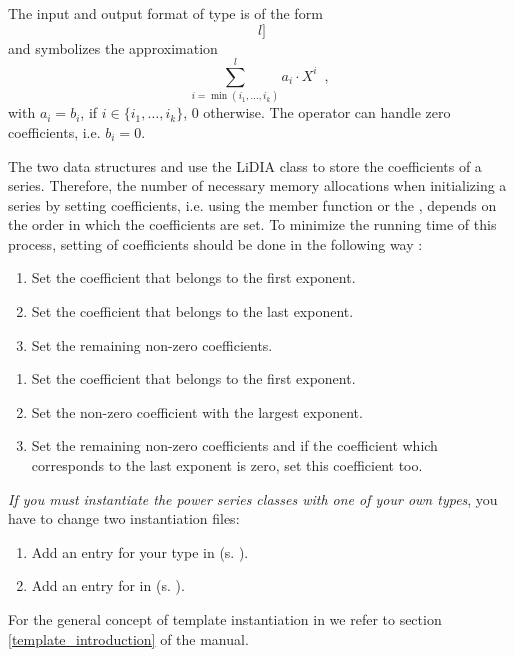 The input and output format of type  is of the form
\begin{displaymath}
  [ [ (b_{i_{1}},i_{1}), \dots, (b_{i_{k}},i_{k}) ] \; l ]
\end{displaymath}
and symbolizes the approximation
\begin{displaymath}
  \sum_{i=\min(i_{1},\dots,i_{k}) }^{l} a_{i} \cdot X^{i}\enspace,
\end{displaymath}
with $a_{i} = b_{i}$, if $i \in \{i_{1}, \dots, i_{k}\}$, $0$ otherwise.  The operator\code{>>}
can handle zero coefficients, i.e. $b_{i} = 0$.



\NOTES

The two data structures  and  use
the LiDIA class  to store the coefficients of a series.  Therefore, the
number of necessary memory allocations when initializing a series by setting coefficients, i.e.
using the member function  or the , depends on the order in
which the coefficients are set.  To minimize the running time of this process, setting of
coefficients should be done in the following way :

\begin{enumerate}
\item Set the coefficient that belongs to the first exponent.
\item Set the coefficient that belongs to the last exponent.
\item Set the remaining non-zero coefficients.
\end{enumerate}

\begin{enumerate}
\item Set the coefficient that belongs to the first exponent.
\item Set the non-zero coefficient with the largest exponent.
\item Set the remaining non-zero coefficients and if the coefficient which corresponds to the
  last exponent is zero, set this coefficient too.
\end{enumerate}

\emph{If you must instantiate the power series classes with one of your own types}, you have to
change two instantiation files:
\begin{enumerate}
\item Add an entry for your type in  (s.
  ).
\item Add an entry for  in
   (s. ).
\end{enumerate}
For the general concept of template instantiation in \LiDIA we refer to section
\ref{template_introduction} of the manual.


